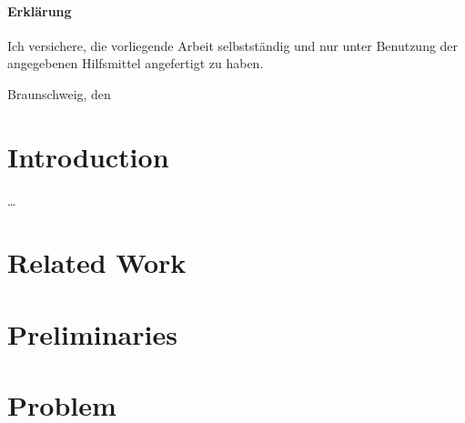 \documentclass[
	a4paper,
	abstracton,
	english,
	twoside
] {scrreprt}
\author{\docauthor}
\date{\isodate{\docdate}}
\title{\doctitle}
\newcommand{\docdate}{2013-07-01}
\theoremstyle{break}
\begin{document}
\maketitle

\subsubsection*{\centering Erklärung}
Ich versichere, die vorliegende Arbeit selbstständig und nur unter Benutzung der angegebenen Hilfsmittel angefertigt zu haben.

\vspace{2em}

Braunschweig, den \printdate{\docdate}
\vspace{5em}

\begin{minipage}{\linewidth}
	\begin{abstract}
	Maxmin length triangulations are just great.
	\end{abstract}

	\begin{abstract}
	Maxmin Triangulationen sind einfach super.
	\end{abstract}
\end{minipage}
\cleardoublepage

\tableofcontents
\cleardoublepage

\cleardoublepage
\setcounter{page}{1}

\chapter{Introduction}
\ldots

\chapter{Related Work}

\chapter{Preliminaries}

\chapter{Problem}
\end{document}
